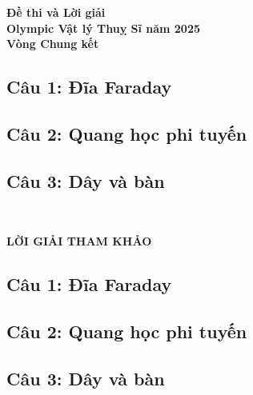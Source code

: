 \documentclass[12pt]{article}
\begin{document}
\thispagestyle{plain}

\begin{center}
  \LARGE{\textbf{Đề thi và Lời giải\\
      Olympic Vật lý Thuỵ Sĩ năm 2025\\
      Vòng Chung kết}}
\end{center}


\subsection*{Câu 1: Đĩa Faraday}


\subsection*{Câu 2: Quang học phi tuyến}


\subsection*{Câu 3: Dây và bàn}


\newpage
\quad\\
\begin{center}
  \vspace{-1cm}
  \noindent\LARGE\textbf{LỜI GIẢI THAM KHẢO}
\end{center}

\subsection*{Câu 1: Đĩa Faraday}


\subsection*{Câu 2: Quang học phi tuyến}


\subsection*{Câu 3: Dây và bàn}

\end{document}
